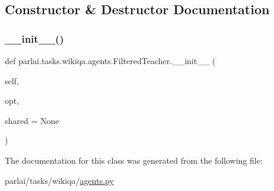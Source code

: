 \subsection{Constructor \& Destructor Documentation}
\mbox{\label{classparlai_1_1tasks_1_1wikiqa_1_1agents_1_1FilteredTeacher_a35563cba37e255a02ee062216736c690}} 
\subsubsection{\texorpdfstring{\+\_\+\+\_\+init\+\_\+\+\_\+()}{\_\_init\_\_()}}
{\footnotesize\ttfamily def parlai.\+tasks.\+wikiqa.\+agents.\+Filtered\+Teacher.\+\_\+\+\_\+init\+\_\+\+\_\+ (\begin{DoxyParamCaption}\item[{}]{self,  }\item[{}]{opt,  }\item[{}]{shared = {\ttfamily None} }\end{DoxyParamCaption})}



The documentation for this class was generated from the following file\+:\begin{DoxyCompactItemize}
\item 
parlai/tasks/wikiqa/\hyperlink{parlai_2tasks_2wikiqa_2agents_8py}{agents.\+py}\end{DoxyCompactItemize}
